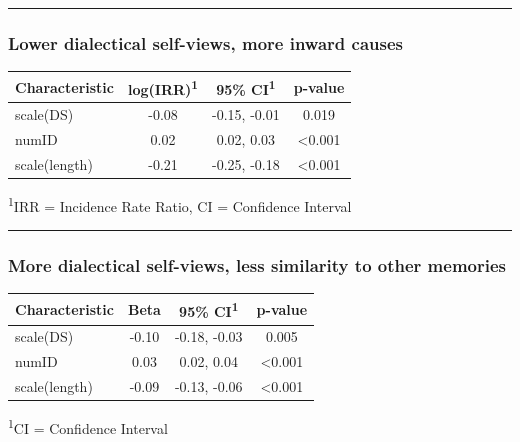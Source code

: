 \documentclass[
  .7em,
  letterpaper,
  DIV=11,
  numbers=noendperiod]{scrartcl}
\begin{document}
\begin{center}\rule{0.5\linewidth}{0.5pt}\end{center}

\hypertarget{lower-dialectical-self-views-more-inward-causes}{%
\subsubsection{Lower dialectical self-views, more inward
causes}\label{lower-dialectical-self-views-more-inward-causes}}

\captionsetup[table]{labelformat=empty,skip=1pt}
\setlength{\LTpost}{0mm}
\begin{longtable}{lccc}
\toprule
\textbf{Characteristic} & \textbf{log(IRR)}\textsuperscript{1} & \textbf{95\% CI}\textsuperscript{1} & \textbf{p-value} \\ 
\midrule
scale(DS) & -0.08 & -0.15, -0.01 & 0.019 \\ 
numID & 0.02 & 0.02, 0.03 & <0.001 \\ 
scale(length) & -0.21 & -0.25, -0.18 & <0.001 \\ 
\bottomrule
\end{longtable}
\begin{minipage}{\linewidth}
\textsuperscript{1}IRR = Incidence Rate Ratio, CI = Confidence Interval\\
\end{minipage}

\begin{center}\rule{0.5\linewidth}{0.5pt}\end{center}

\hypertarget{more-dialectical-self-views-less-similarity-to-other-memories}{%
\subsubsection{More dialectical self-views, less similarity to other
memories}\label{more-dialectical-self-views-less-similarity-to-other-memories}}

\captionsetup[table]{labelformat=empty,skip=1pt}
\setlength{\LTpost}{0mm}
\begin{longtable}{lccc}
\toprule
\textbf{Characteristic} & \textbf{Beta} & \textbf{95\% CI}\textsuperscript{1} & \textbf{p-value} \\ 
\midrule
scale(DS) & -0.10 & -0.18, -0.03 & 0.005 \\ 
numID & 0.03 & 0.02, 0.04 & <0.001 \\ 
scale(length) & -0.09 & -0.13, -0.06 & <0.001 \\ 
\bottomrule
\end{longtable}
\begin{minipage}{\linewidth}
\textsuperscript{1}CI = Confidence Interval\\
\end{minipage}
\end{document}
